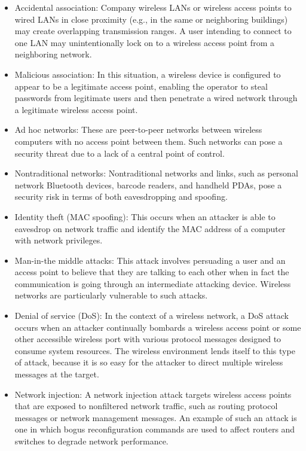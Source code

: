 \documentclass[12pt]{article}
\begin{document}
 \begin{itemize}
 	\item Accidental association: Company wireless LANs or wireless access points to wired LANs in close proximity (e.g., in the same or neighboring buildings) may create overlapping transmission ranges. A user intending to connect to one LAN may	unintentionally lock on to a wireless access point from a neighboring network.
 	\item Malicious association: In this situation, a wireless device is configured to appear to be a legitimate access point, enabling the operator to steal passwords from legitimate users and then penetrate a wired network through a legitimate wireless access point.
 	\item Ad hoc networks: These are peer-to-peer networks between wireless computers with no access point between them. Such networks can pose a security threat due to a lack of a central point of control.
 	\item Nontraditional networks: Nontraditional networks and links, such as personal network Bluetooth devices, barcode readers, and handheld PDAs, pose a security risk in terms of both eavesdropping and spoofing.
 	\item Identity theft (MAC spoofing): This occurs when an attacker is able to eavesdrop on network traffic and identify the MAC address of a computer with network privileges.
 	\item Man-in-the middle attacks: This attack involves persuading a user and an access point to believe that they are talking to each other when in fact the communication is going through an intermediate attacking device. Wireless networks are particularly vulnerable to such attacks.
 	\item Denial of service (DoS): In the context of a wireless network, a DoS attack occurs when an attacker continually bombards a wireless access point or some other accessible wireless port with various protocol messages designed to consume system resources. The wireless environment lends itself to this type of attack,
 	because it is so easy for the attacker to direct multiple wireless messages at the target.
 	\item Network injection: A network injection attack targets wireless access points that are exposed to nonfiltered network traffic, such as routing protocol messages or network management messages. An example of such an attack is one in which bogus reconfiguration commands are used to affect routers and switches to
 	degrade network performance.
 \end{itemize}
\end{document}
